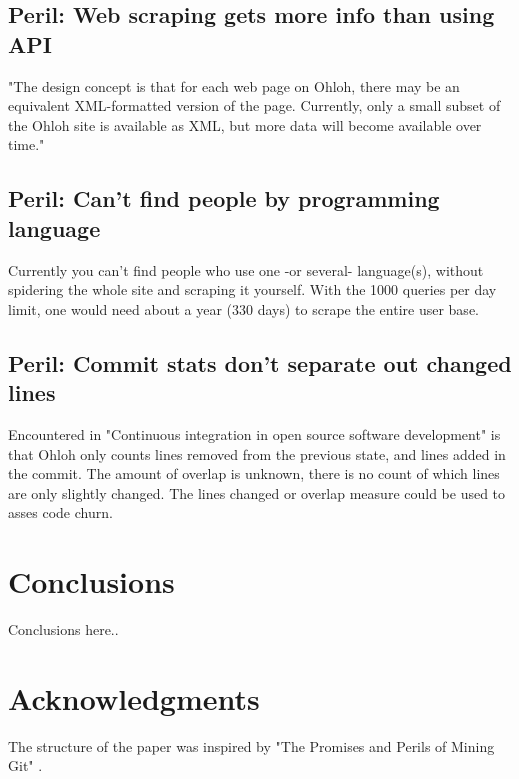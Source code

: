 \documentclass{sig-alternate}
\begin{document}
\subsection{Peril: Web scraping gets more info than using API}
"The design concept is that for each web page on Ohloh, there may be an equivalent XML-formatted version of the page. Currently, only a small subset of the Ohloh site is available as XML, but more data will become available over time." \cite{ohloh-api}


\subsection{Peril: Can't find people by programming language}
Currently you can't find people who use one -or several- language(s), without spidering the whole site and scraping it yourself. With the 1000 queries per day limit, one would need about a year (330 days) to scrape the entire user base.


\subsection{Peril: Commit stats don't separate out changed lines}
Encountered in "Continuous integration in open source software development" \cite{Deshpande:2008p4463} is that Ohloh only counts lines removed from the previous state, and lines added in the commit. The amount of overlap is unknown, there is no count of which lines are only slightly changed. The lines changed or overlap measure could be used to asses code churn.


\section{Conclusions}
Conclusions here..


\section{Acknowledgments}
The structure of the paper was inspired by "The Promises and Perils of Mining Git" \cite{Bird:2009p4462}.



\end{document}
